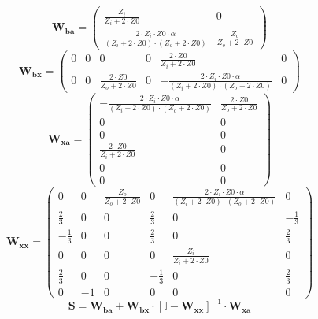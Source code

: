 \[ \mathbf{W_{ba}} = \left(\begin{smallmatrix} \frac{Z_i}{Z_i+2\cdot
Z0} & 0 \\ \frac{2\cdot Z_i\cdot Z0\cdot \alpha}{\left(Z_i+2\cdot
Z0\right)\cdot\left(Z_o+2\cdot Z0\right)} & \frac{Z_o}{Z_o+2\cdot Z0}
\end{smallmatrix}\right) \]
\[ \mathbf{W_{bx}} = \left(\begin{smallmatrix} 0 & 0 & 0 & 0 &
\frac{2\cdot Z0}{Z_i+2\cdot Z0} & 0 \\ 0 & 0 & \frac{2\cdot
Z0}{Z_o+2\cdot Z0} & 0 & -\frac{2\cdot Z_i\cdot Z0\cdot
\alpha}{\left(Z_i+2\cdot Z0\right)\cdot\left(Z_o+2\cdot Z0\right)} & 0
\end{smallmatrix}\right) \]
\[ \mathbf{W_{xa}} = \left(\begin{smallmatrix} -\frac{2\cdot Z_i\cdot
Z0\cdot \alpha}{\left(Z_i+2\cdot Z0\right)\cdot\left(Z_o+2\cdot
Z0\right)} & \frac{2\cdot Z0}{Z_o+2\cdot Z0} \\ 0 & 0 \\ 0 & 0 \\
\frac{2\cdot Z0}{Z_i+2\cdot Z0} & 0 \\ 0 & 0 \\ 0 & 0
\end{smallmatrix}\right) \]
\[ \mathbf{W_{xx}} = \left(\begin{smallmatrix} 0 & 0 &
\frac{Z_o}{Z_o+2\cdot Z0} & 0 & \frac{2\cdot Z_i\cdot Z0\cdot
\alpha}{\left(Z_i+2\cdot Z0\right)\cdot\left(Z_o+2\cdot Z0\right)} & 0
\\ \frac{2}{3} & 0 & 0 & \frac{2}{3} & 0 & -\frac{1}{3} \\
-\frac{1}{3} & 0 & 0 & \frac{2}{3} & 0 & \frac{2}{3} \\ 0 & 0 & 0 & 0
& \frac{Z_i}{Z_i+2\cdot Z0} & 0 \\ \frac{2}{3} & 0 & 0 & -\frac{1}{3}
& 0 & \frac{2}{3} \\ 0 & -1 & 0 & 0 & 0 & 0 \end{smallmatrix}\right)
\]
\[ \mathbf{S}=\mathbf{W_{ba}}+\mathbf{W_{bx}}\cdot\left[ \mathbb{I}
-\mathbf{W_{xx}}\right]^{-1}\cdot\mathbf{W_{xa}} \]
